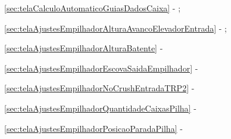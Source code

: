 \begin{procedureAdjustmentNoRecipe}
\begin{stacker}
    \item[\ding{\dingNumber}] \ref{sec:telaCalculoAutomaticoGuiasDadosCaixa} - ;
    \item[\ding{\dingNumber}] \ref{sec:telaAjustesEmpilhadorAlturaAvancoElevadorEntrada} - ;
    \item[\ding{\dingNumber}] \ref{sec:telaAjustesEmpilhadorAlturaBatente} - 
    \item[\ding{\dingNumber}] \ref{sec:telaAjustesEmpilhadorEscovaSaidaEmpilhador} - 
    \item[\ding{\dingNumber}] \ref{sec:telaAjustesEmpilhadorNoCrushEntradaTRP2} - 
    \item[\ding{\dingNumber}] \ref{sec:telaAjustesEmpilhadorQuantidadeCaixasPilha} - 
    \item[\ding{\dingNumber}] \ref{sec:telaAjustesEmpilhadorPosicaoParadaPilha} - 
    
  \end{stacker}
    

\end{procedureAdjustmentNoRecipe}
